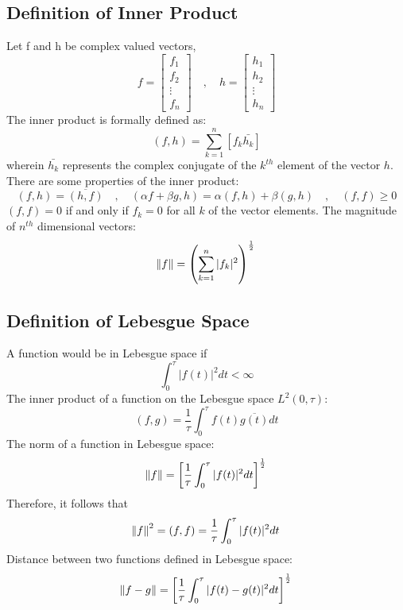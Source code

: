 \documentclass[a4paper, 12pt]{report}
\def\a{\alpha}
\def\be{\beta}
\def\f{\frac}
\def\l{\left}
\def\r{\right}
\def\b{\bar}
\def\h{\hat}
\begin{document}
\begin{center}
\subsection {Definition of Inner Product}
Let f and h be complex valued vectors,
$$f = \begin{bmatrix}f_1\\f_2\\\vdots \\f_n \end{bmatrix}\quad,\quad h = \begin{bmatrix}h_1\\h_2\\\vdots \\h_n \end{bmatrix}$$
The inner product is formally defined as:
$$(f,h) = \sum_{k = 1}^{n}\l[f_k\bar{h_k}\r]$$
wherein $\b{h_k}$ represents the complex conjugate of the $k^{th}$ element of the vector $h$. There are some properties of the inner product:
$$(f,h) = \overline{(h,f)}\quad,\quad (\a f + \be g,h) = \a(f,h) + \be(g,h) \quad,\quad (f,f)\geq0$$
$(f,f) = 0$ if and only if $f_k = 0$ for all $k$ of the vector elements. The magnitude of $n^{th}$ dimensional vectors:
$$\norm{f} = \l(\sum_{k = 1}^{n}|f_k|^2\r)^{\f{1}{2}}$$
\subsection {Definition of Lebesgue Space}
A function would be in Lebesgue space if
$$\int^{\tau}_{0}|f(t)|^2dt < \infty$$
The inner product of a function on the Lebesgue space $L^2(0,\tau)$:
$$(f,g) = \f{1}{\tau}\int^{\tau}_{0}f(t)\overline{g(t)}dt$$
The norm of a function in Lebesgue space:
$$\norm{f} = \l[\f{1}{\tau}\int^{\tau}_{0}|f(t)|^2dt\r]^\f{1}{2}$$
Therefore, it follows that 
$$\norm{f}^2 = (f,f) = \f{1}{\tau}\int^{\tau}_{0}|f(t)|^2dt$$
Distance between two functions defined in Lebesgue space:
$$\norm{f - g} = \l[\f{1}{\tau}\int^{\tau}_{0}|f(t) - g(t)|^2dt\r]^\f{1}{2}$$

\end{center}
\end{document}
